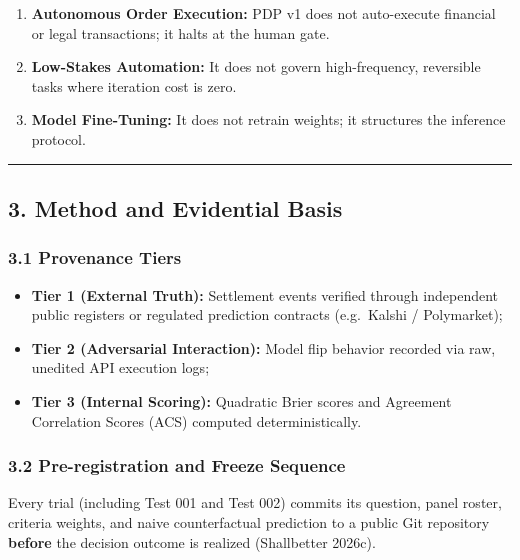 \documentclass[
]{article}
\providecommand{\tightlist}{%
  \setlength{\itemsep}{0pt}\setlength{\parskip}{0pt}}
\begin{document}
\begin{enumerate}
\def\labelenumi{\arabic{enumi}.}
\tightlist
\item
  \textbf{Autonomous Order Execution:} PDP v1 does not auto-execute
  financial or legal transactions; it halts at the human gate.
\item
  \textbf{Low-Stakes Automation:} It does not govern high-frequency,
  reversible tasks where iteration cost is zero.
\item
  \textbf{Model Fine-Tuning:} It does not retrain weights; it structures
  the inference protocol.
\end{enumerate}

\begin{center}\rule{0.5\linewidth}{0.5pt}\end{center}

\subsection{3. Method and Evidential
Basis}\label{method-and-evidential-basis}

\subsubsection{3.1 Provenance Tiers}\label{provenance-tiers}

\begin{itemize}
\tightlist
\item
  \textbf{Tier 1 (External Truth):} Settlement events verified through
  independent public registers or regulated prediction contracts
  (e.g.~Kalshi / Polymarket);
\item
  \textbf{Tier 2 (Adversarial Interaction):} Model flip behavior
  recorded via raw, unedited API execution logs;
\item
  \textbf{Tier 3 (Internal Scoring):} Quadratic Brier scores and
  Agreement Correlation Scores (ACS) computed deterministically.
\end{itemize}

\subsubsection{3.2 Pre-registration and Freeze
Sequence}\label{pre-registration-and-freeze-sequence}

Every trial (including Test 001 and Test 002) commits its question,
panel roster, criteria weights, and naive counterfactual prediction to a
public Git repository \textbf{before} the decision outcome is realized
(Shallbetter 2026c).
\end{document}
